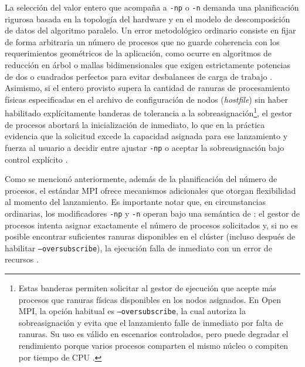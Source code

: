 La selección del valor entero que acompaña a \texttt{-np} o \texttt{-n} demanda una planificación rigurosa basada en la topología del hardware y en el modelo de descomposición de datos del algoritmo paralelo. Un error metodológico ordinario consiste en fijar de forma arbitraria un número de procesos que no guarde coherencia con los requerimientos geométricos de la aplicación, como ocurre en algoritmos de reducción en árbol o mallas bidimensionales que exigen estrictamente potencias de dos o cuadrados perfectos para evitar desbalances de carga de trabajo \cite{grama_intro_parallel_2003}. Asimismo, si el entero provisto supera la cantidad de ranuras de procesamiento físicas especificadas en el archivo de configuración de nodos (\textit{hostfile}) sin haber habilitado explícitamente banderas de tolerancia a la sobreasignación\footnote{Estas banderas permiten solicitar al gestor de ejecución que acepte más procesos que ranuras físicas disponibles en los nodos asignados. En Open MPI, la opción habitual es \texttt{--oversubscribe}, la cual autoriza la sobreasignación y evita que el lanzamiento falle de inmediato por falta de ranuras. Su uso es válido en escenarios controlados, pero puede degradar el rendimiento porque varios procesos comparten el mismo núcleo o compiten por tiempo de CPU \cite{open_mpi_2026}.}, el gestor de procesos abortará la inicialización de inmediato, lo que en la práctica evidencia que la solicitud excede la capacidad asignada para ese lanzamiento y fuerza al usuario a decidir entre ajustar \texttt{-np} o aceptar la sobreasignación bajo control explícito \cite{open_mpi_2026}.

Como se mencionó anteriormente, además de la planificación del número de procesos, el estándar MPI ofrece mecanismos adicionales que otorgan flexibilidad al momento del lanzamiento. Es importante notar que, en circunstancias ordinarias, los modificadores \texttt{-np} y \texttt{-n} operan bajo una semántica de : el gestor de procesos intenta asignar exactamente el número de procesos solicitados y, si no es posible encontrar suficientes ranuras disponibles en el clúster (incluso después de habilitar \texttt{--oversubscribe}), la ejecución falla de inmediato con un error de recursos \cite{open_mpi_2026}. 

